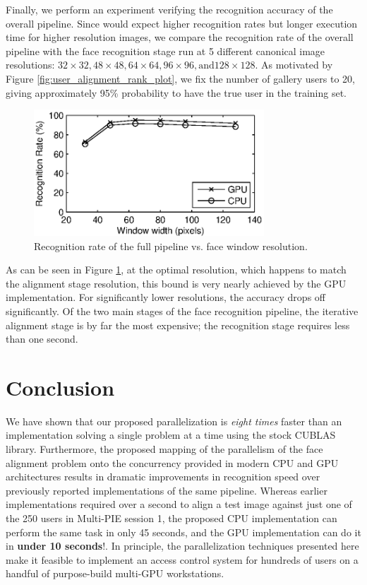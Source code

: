 \documentclass[10pt,twocolumn,letterpaper]{article}
\begin{document}
Finally, we perform an experiment verifying the recognition accuracy of the
overall pipeline.  Since would expect higher recognition rates but longer
execution time for higher resolution images, we compare the recognition rate of
the overall pipeline with the face recognition stage run at 5 different
canonical image resolutions: $32\times32, 48 \times 48, 64 \times 64, 96 \times
96, \textrm{and} 128 \times 128$.  As motivated by Figure
\ref{fig:user_alignment_rank_plot}, we fix the number of gallery users to 20,
giving approximately 95\% probability to have the true user in the training
set.  
\begin{figure}
\centering
\includegraphics[width=3.4in]{figures/accuracyVsResolution}
\caption{Recognition rate of the full pipeline vs. face window resolution.}
\label{fig:accuracy_vs_resolution}
\end{figure}
As can be seen in Figure \ref{fig:accuracy_vs_resolution}, at the optimal
resolution, which happens to match the alignment stage resolution, this bound
is very nearly achieved by the GPU implementation.  For significantly lower
resolutions, the accuracy drops off significantly.  Of the two main stages of
the face recognition pipeline, the iterative alignment stage is by far the most
expensive; the recognition stage requires less than one second.

\section{Conclusion}
We have shown that our proposed parallelization is {\em eight times} faster
than an implementation solving a single problem at a time using the stock
CUBLAS library. Furthermore, the proposed mapping of the parallelism of the
face alignment problem onto the concurrency provided in modern CPU and GPU
architectures results in dramatic improvements in recognition speed over
previously reported implementations of the same pipeline.  Whereas earlier
implementations required over a second to align a test image against just one
of the 250 users in Multi-PIE session 1, the proposed CPU implementation can
perform the same task in only 45 seconds, and the GPU implementation can do it
in {\bf under 10 seconds}!.  In principle, the parallelization techniques
presented here make it feasible to implement an access control system for
hundreds of users on a handful of purpose-build multi-GPU workstations.


{\small


}
\end{document}
